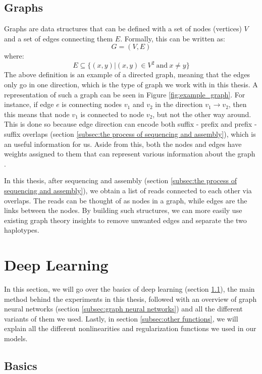 \documentclass[times, utf8, diplomski, english]{fer_eng}
\begin{document}
\subsection{Graphs}

Graphs are data structures that can be defined with a set of nodes (vertices) $V$ and a set of edges connecting them $E$. Formally, this can be written as:
\[ G = (V, E) \]
where:
\[ E \subseteq 	\{ (x, y)|(x, y) \in V^2 \mathrm{\ and\ } x \neq y \} \]
The above definition is an example of a directed graph, meaning that the edges only go in one direction, which is the type of graph we work with in this thesis. A representation of such a graph can be seen in Figure \ref{fig:example_graph}. For instance, if edge $e$ is connecting nodes $v_1$ and $v_2$ in the direction $v_1 \rightarrow v_2$, then this means that node $v_1$ is connected to node $v_2$, but not the other way around. This is done so because edge direction can encode both suffix - prefix and prefix - suffix overlaps (section \ref{subsec:the process of sequencing and assembly}), which is an useful information for us. Aside from this, both the nodes and edges have weights assigned to them that can represent various information about the graph \cite{trudeau_2017}.

In this thesis, after sequencing and assembly (section \ref{subsec:the process of sequencing and assembly}), we obtain a list of reads connected to each other via overlaps. The reads can be thought of as nodes in a graph, while edges are the links between the nodes. By building such structures, we can more easily use existing graph theory insights to remove unwanted edges and separate the two haplotypes.

\section{Deep Learning}

In this section, we will go over the basics of deep learning (section \ref{subsec:basics}), the main method behind the experiments in this thesis, followed with an overview of graph neural networks (section \ref{subsec:graph neural networks}) and all the different variants of them we used. Lastly, in section \ref{subsec:other functions}, we will explain all the different nonlinearities and regularization functions we used in our models.

\subsection{Basics}
\label{subsec:basics}
\end{document}
